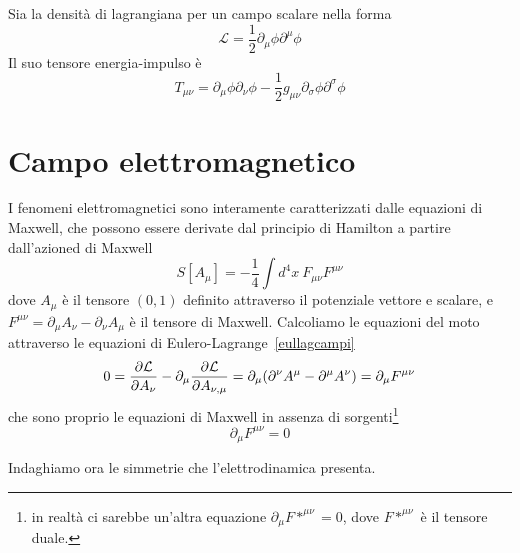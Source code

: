    \begin{example}
    Sia la densità di lagrangiana per un campo scalare nella forma
    \begin{equation*}
        \mathcal L = \frac{1}{2} \partial_\mu \phi \partial^\mu \phi
    \end{equation*}
    Il suo tensore energia-impulso è
    \begin{equation*}
        T_{\mu\nu} = \partial_\mu \phi \partial_\nu \phi - \frac{1}{2} g_{\mu\nu} \partial_\sigma \phi \partial^\sigma \phi
    \end{equation*}
    \end{example}

\section{Campo elettromagnetico}
    I fenomeni elettromagnetici sono interamente caratterizzati dalle equazioni di Maxwell, che possono essere derivate dal principio di Hamilton a partire dall'azioned di Maxwell
\begin{equation} \label{azionemaxwell}
    S[A_\mu] = - \frac{1}{4} \int d^4 x ~ F_{\mu\nu} F^{\mu\nu}
\end{equation}
    dove $A_\mu$ è il tensore $(0, 1)$ definito attraverso il potenziale vettore e scalare, e $F^{\mu\nu} = \partial_\mu A_\nu - \partial_\nu A_\mu$ è il tensore di Maxwell. Calcoliamo le equazioni del moto attraverso le equazioni di Eulero-Lagrange~\eqref{eullagcampi}
\begin{equation*}
    0 = \frac{\partial\mathcal L}{\partial A_\nu} - \partial_\mu \frac{\partial\mathcal L}{\partial A_{\nu,\mu}} = \partial_\mu (\partial^\nu A^\mu - \partial^\mu A^\nu) = \partial_\mu F^{\mu\nu}
\end{equation*}
    che sono proprio le equazioni di Maxwell in assenza di sorgenti\footnote{in realtà ci sarebbe un'altra equazione $\partial_\mu F*^{\mu\nu} = 0$, dove $F*^{\mu\nu}$ è il tensore duale.}
\begin{equation}\label{eqmax}
    \partial_\mu F^{\mu\nu} = 0
\end{equation}

    Indaghiamo ora le simmetrie che l'elettrodinamica presenta.

